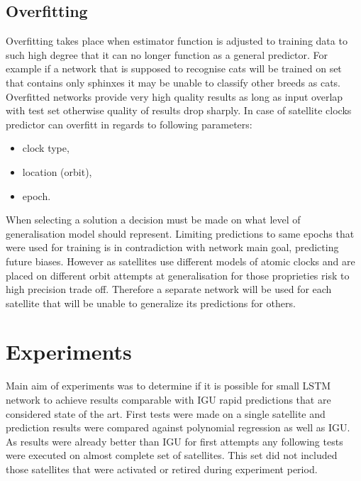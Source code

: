 \documentclass{article}
\begin{document}
\subsection{Overfitting}  
Overfitting takes place when estimator function is adjusted to training data to such high
degree that it can no longer function as a general predictor.
For example if a network that is supposed to recognise cats will be trained on set that contains
only sphinxes it may be unable to classify other breeds as cats.
Overfitted networks provide very high quality results as long as input overlap with test set
otherwise quality of results drop sharply.
In case of satellite clocks predictor can overfitt in regards to following parameters:
\begin{itemize}
\item clock type,
\item location (orbit),
\item epoch.
\end{itemize}
When selecting a solution a decision must be made on what level of generalisation model should
represent. Limiting predictions to same epochs that were used for training is in contradiction
with network main goal, predicting future biases. However as satellites use different models
of atomic clocks and are placed on different orbit attempts at generalisation for those
proprieties risk to high precision trade off.
Therefore a separate network will be used for each satellite that will be unable to generalize
its predictions for others.

\FloatBarrier
\section{Experiments}
Main aim of experiments was to determine if it is possible for small LSTM network to 
achieve results comparable with IGU rapid predictions that are considered state of the art.
First tests were made on a single satellite and prediction results were compared against 
polynomial regression as well as IGU. As results were already better than IGU for first attempts
any following tests were executed on almost complete set of satellites. This set did not included
those satellites that were activated or retired during experiment period.

\end{document}
